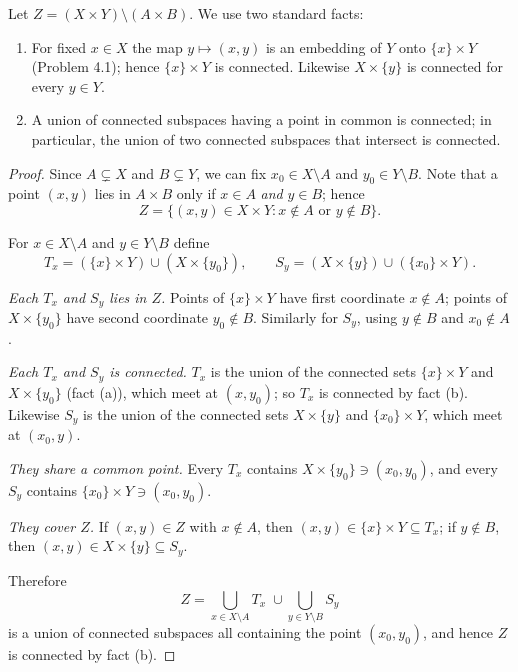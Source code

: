 
Let $Z=(X\times Y)\setminus(A\times B)$. We use two standard facts:
\begin{enumerate}[label=(\alph*)]
  \item For fixed $x\in X$ the map $y\mapsto(x,y)$ is an embedding of $Y$ onto $\{x\}\times Y$
        (Problem 4.1); hence $\{x\}\times Y$ is connected. Likewise $X\times\{y\}$ is connected
        for every $y\in Y$.
  \item A union of connected subspaces having a point in common is connected; in particular, the
        union of two connected subspaces that intersect is connected.
\end{enumerate}

\begin{proof}
Since $A\subsetneq X$ and $B\subsetneq Y$, we can fix $x_0\in X\setminus A$ and
$y_0\in Y\setminus B$. Note that a point $(x,y)$ lies in $A\times B$ only if $x\in A$
\emph{and} $y\in B$; hence
\[ Z=\{(x,y)\in X\times Y : x\notin A \text{ or } y\notin B\}. \]

For $x\in X\setminus A$ and $y\in Y\setminus B$ define
\[ T_x=(\{x\}\times Y)\cup(X\times\{y_0\}),\qquad S_y=(X\times\{y\})\cup(\{x_0\}\times Y). \]

\emph{Each $T_x$ and $S_y$ lies in $Z$.} Points of $\{x\}\times Y$ have first coordinate
$x\notin A$; points of $X\times\{y_0\}$ have second coordinate $y_0\notin B$. Similarly for
$S_y$, using $y\notin B$ and $x_0\notin A$.

\emph{Each $T_x$ and $S_y$ is connected.} $T_x$ is the union of the connected sets
$\{x\}\times Y$ and $X\times\{y_0\}$ (fact (a)), which meet at $(x,y_0)$; so $T_x$ is connected
by fact (b). Likewise $S_y$ is the union of the connected sets $X\times\{y\}$ and
$\{x_0\}\times Y$, which meet at $(x_0,y)$.

\emph{They share a common point.} Every $T_x$ contains $X\times\{y_0\}\ni(x_0,y_0)$, and every
$S_y$ contains $\{x_0\}\times Y\ni(x_0,y_0)$.

\emph{They cover $Z$.} If $(x,y)\in Z$ with $x\notin A$, then $(x,y)\in\{x\}\times Y\subseteq T_x$;
if $y\notin B$, then $(x,y)\in X\times\{y\}\subseteq S_y$.

Therefore
\[ Z=\bigcup_{x\in X\setminus A}T_x\;\cup\bigcup_{y\in Y\setminus B}S_y \]
is a union of connected subspaces all containing the point $(x_0,y_0)$, and hence $Z$ is
connected by fact (b).
\end{proof}
